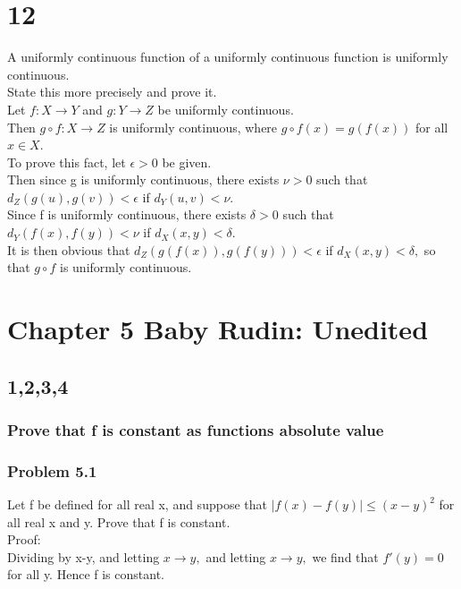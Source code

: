 \section*{12}
A uniformly continuous function of a uniformly continuous function is uniformly continuous. \\ 
State this more precisely and prove it. \\ 
Let $f: X \longrightarrow Y$ and $g: Y \longrightarrow Z$ be uniformly continuous. \\ 
Then $g \circ f : X \longrightarrow Z$ is uniformly continuous, where $g \circ f(x)=g(f(x))$ for all $x \in X.$ \\ 
To prove this fact, let $ \epsilon>0$ be given. \\ 
Then since g is uniformly continuous, there exists $ \nu >0$ such that $d_Z(g(u),g(v))< \epsilon$ if $d_Y(u,v)< \nu.$ \\ 
Since f is uniformly continuous, there exists $\delta >0$ such that $d_Y(f(x),f(y))< \nu$ if $d_X(x,y) < \delta.$ \\ 
It is then obvious that $d_Z(g(f(x)),g(f(y)))< \epsilon$ if $d_X(x,y)< \delta,$ so that $g \circ f$ is uniformly continuous. 



\section{Chapter 5 Baby Rudin: Unedited}


\subsection{1,2,3,4}

\subsubsection{Prove that f is constant as functions absolute value}
\subsubsection*{Problem 5.1}

Let f be defined for all real x, and suppose that $|f(x)-f(y)|\leq (x-y)^2$ for all real x and y. Prove that f is constant. \\ 
Proof: \\ 
Dividing by x-y, and letting $x \rightarrow y,$ and letting $x \rightarrow y,$ we find that $f'(y)=0$ for all y. Hence f is constant. 

